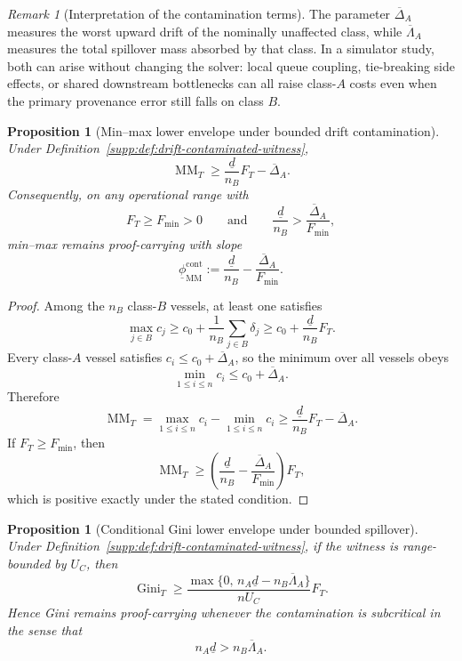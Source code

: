 \documentclass[11pt]{article}
\newcommand{\1}{\mathbf{1}}
\newcommand{\Gini}{\operatorname{Gini}}
\newcommand{\MM}{\operatorname{MM}}
\theoremstyle{definition}
\theoremstyle{plain}
\newtheorem{proposition}[definition]{Proposition}
\theoremstyle{remark}
\newtheorem{remark}[definition]{Remark}
\begin{document}
\begin{remark}[Interpretation of the contamination terms]
\label{supp:rem:contamination-interpretation}
The parameter $\overline\Delta_A$ measures the worst upward drift of the nominally unaffected class, while $\overline\Lambda_A$ measures the total spillover mass absorbed by that class. In a simulator study, both can arise without changing the solver: local queue coupling, tie-breaking side effects, or shared downstream bottlenecks can all raise class-$A$ costs even when the primary provenance error still falls on class $B$.
\end{remark}

\begin{proposition}[Min--max lower envelope under bounded drift contamination]
\label{supp:prop:minmax-contaminated}
Under Definition~\ref{supp:def:drift-contaminated-witness},
\[
\MM_T \ge \frac{\underline d}{n_B} F_T - \overline\Delta_A.
\]
Consequently, on any operational range with
\[
F_T \ge F_{\min}>0
\qquad\text{and}\qquad
\frac{\underline d}{n_B} > \frac{\overline\Delta_A}{F_{\min}},
\]
min--max remains proof-carrying with slope
\[
\underline\phi_{\MM}^{\mathrm{cont}}
:=
\frac{\underline d}{n_B} - \frac{\overline\Delta_A}{F_{\min}}.
\]
\end{proposition}

\begin{proof}
Among the $n_B$ class-$B$ vessels, at least one satisfies
\[
\max_{j\in B} c_j
\ge
c_0 + \frac{1}{n_B}\sum_{j\in B}\delta_j
\ge
c_0 + \frac{\underline d}{n_B}F_T.
\]
Every class-$A$ vessel satisfies $c_i\le c_0+\overline\Delta_A$, so the minimum over all vessels obeys
\[
\min_{1\le i\le n} c_i \le c_0+\overline\Delta_A.
\]
Therefore
\[
\MM_T
=
\max_{1\le i\le n} c_i - \min_{1\le i\le n} c_i
\ge
\frac{\underline d}{n_B}F_T - \overline\Delta_A.
\]
If $F_T\ge F_{\min}$, then
\[
\MM_T
\ge
\left(\frac{\underline d}{n_B} - \frac{\overline\Delta_A}{F_{\min}}\right)F_T,
\]
which is positive exactly under the stated condition.
\end{proof}

\begin{proposition}[Conditional Gini lower envelope under bounded spillover]
\label{supp:prop:gini-contaminated}
Under Definition~\ref{supp:def:drift-contaminated-witness}, if the witness is range-bounded by $U_C$, then
\[
\Gini_T
\ge
\frac{\max\{0,\,n_A\underline d - n_B\overline\Lambda_A\}}{nU_C}
F_T.
\]
Hence Gini remains proof-carrying whenever the contamination is \emph{subcritical} in the sense that
\[
n_A\underline d > n_B\overline\Lambda_A.
\]
\end{proposition}
\end{document}
